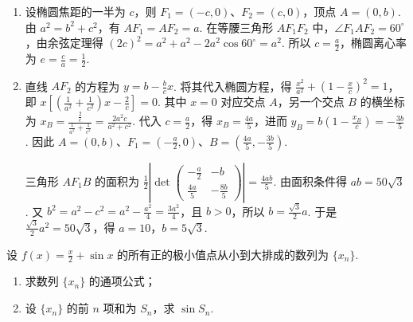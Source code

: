 \begin{solution}
\begin{enumerate}
\item 设椭圆焦距的一半为 \(c\)，则 \(F_1=(-c,0)\)、\(F_2=(c,0)\)，顶点 \(A=(0,b)\). 由 \(a^2=b^2+c^2\)，有 \(AF_1=AF_2=a\). 在等腰三角形 \(AF_1F_2\) 中，\(\angle F_1AF_2=60^{\circ}\)，由余弦定理得
\((2c)^2=a^2+a^2-2a^2\cos60^{\circ}=a^2\).
所以 \(c=\frac{a}{2}\)，椭圆离心率为 \(e=\frac{c}{a}=\frac{1}{2}\).
\item 直线 \(AF_2\) 的方程为 \(y=b-\frac{b}{c}x\). 将其代入椭圆方程，得
\(\frac{x^2}{a^2}+\left(1-\frac{x}{c}\right)^2=1\)，即
\(x\left[\left(\frac{1}{a^2}+\frac{1}{c^2}\right)x-\frac{2}{c}\right]=0\).
其中 \(x=0\) 对应交点 \(A\)，另一个交点 \(B\) 的横坐标为
\(x_B=\frac{\frac{2}{c}}{\frac{1}{a^2}+\frac{1}{c^2}}=\frac{2a^2c}{a^2+c^2}\). 代入 \(c=\frac{a}{2}\)，得 \(x_B=\frac{4a}{5}\)，进而 \(y_B=b\left(1-\frac{x_B}{c}\right)=-\frac{3b}{5}\). 因此 \(A=(0,b)\)、\(F_1=(-\frac{a}{2},0)\)、\(B=(\frac{4a}{5},-\frac{3b}{5})\).

三角形 \(AF_1B\) 的面积为
\(\frac{1}{2}\left|\det\begin{pmatrix}-\frac{a}{2}&-b\\ \frac{4a}{5}&-\frac{8b}{5}\end{pmatrix}\right|=\frac{4ab}{5}\).
由面积条件得 \(ab=50\sqrt{3}\). 又 \(b^2=a^2-c^2=a^2-\frac{a^2}{4}=\frac{3a^2}{4}\)，且 \(b>0\)，所以 \(b=\frac{\sqrt{3}}{2}a\). 于是 \(\frac{\sqrt{3}}{2}a^2=50\sqrt{3}\)，得 \(a=10\)，\(b=5\sqrt{3}\).
\end{enumerate}
\end{solution}

\begin{problem}
设 \(f(x) = \frac{x}{2} + \sin x\) 的所有正的极小值点从小到大排成的数列为 \(\{x_n\}\).

\begin{enumerate}
\item 求数列 \(\{x_n\}\) 的通项公式；
\item 设 \(\{x_n\}\) 的前 \(n\) 项和为 \(S_n\)，求 \(\sin S_n\).
\end{enumerate}
\end{problem}

